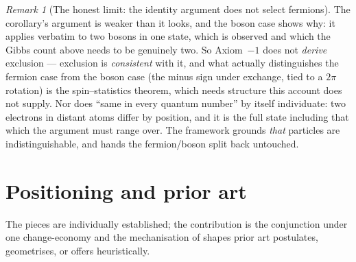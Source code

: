 \documentclass[11pt,a4paper]{article}
\theoremstyle{remark}\newtheorem{remark}[definition]{Remark}
\begin{document}
\begin{remark}[The honest limit: the identity argument does not select fermions]\label{rem:spin-stat}
The corollary's argument is weaker than it looks, and the boson case shows why: it applies
verbatim to two bosons in one state, which is observed and which the Gibbs count above needs
to be genuinely two. So Axiom~$-1$ does not \emph{derive} exclusion --- exclusion is
\emph{consistent} with it, and what actually distinguishes the fermion case from the boson
case (the minus sign under exchange, tied to a $2\pi$ rotation) is the spin--statistics
theorem, which needs structure this account does not supply. Nor does ``same in every quantum
number'' by itself individuate: two electrons in distant atoms differ by position, and it is
the full state including that which the argument must range over. The framework grounds
\emph{that} particles are indistinguishable, and hands the fermion/boson split back untouched.
\end{remark}

\section{Positioning and prior art}\label{sec:prior-art}
The pieces are individually established; the contribution is the conjunction
under one change-economy and the mechanisation of shapes prior art postulates,
geometrises, or offers heuristically.
\end{document}
